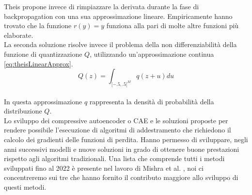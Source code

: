 Theis propone invece di rimpiazzare la derivata durante la fase di backpropagation con una sua approssimazione lineare. Empiricamente hanno trovato che la funzione $r(y)=y$ funziona alla pari di molte altre funzioni più elaborate.\\
La seconda soluzione risolve invece il problema della non differenziabilità della funzione di quantizzazione $Q$, utilizzando un’approssimazione continua \ref{eq:theisLinearApprox}.\\
\begin{equation}\label{eq:theisLinearApprox}
    Q(z) = \int_{[-.5,.5[^{M}} q(z+u) du
\end{equation}\\
In questa approssimazione $q$ rappresenta la densità di probabilità della distribuzione $Q$.\\
Lo sviluppo dei compressive autoencoder o CAE e le soluzioni proposte per rendere possibile l’esecuzione di algoritmi di addestramento che richiedono il calcolo dei gradienti delle funzioni di perdita. Hanno permesso di sviluppare, negli anni successivi modelli e nuove soluzioni in grado di ottenere buone prestazioni rispetto agli algoritmi tradizionali. Una lista che comprende tutti i metodi sviluppati fino al 2022 è presente nel lavoro di Mishra et al. \cite{mishra2022deep}, noi ci concentreremo sui tre che hanno fornito il contributo maggiore allo sviluppo di questi metodi.


